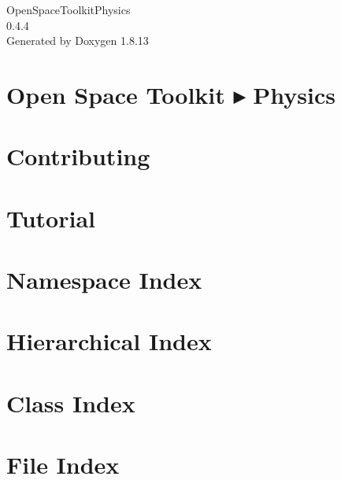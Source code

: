 \documentclass[twoside]{book}
\newcommand{\+}{\discretionary{\mbox{\scriptsize$\hookleftarrow$}}{}{}}
\newcommand{\clearemptydoublepage}{%
  \newpage{\pagestyle{empty}\cleardoublepage}%
}
\begin{document}
\hypersetup{pageanchor=false,
             bookmarksnumbered=true,
             pdfencoding=unicode
            }
\begin{titlepage}
\vspace*{7cm}
\begin{center}%
{\Large Open\+Space\+Toolkit\+Physics \\[1ex]\large 0.\+4.\+4 }\\
\vspace*{1cm}
{\large Generated by Doxygen 1.8.13}\\
\end{center}
\end{titlepage}
\clearemptydoublepage
{}
\tableofcontents
\clearemptydoublepage
{}
\hypersetup{pageanchor=true}

\chapter{Open Space Toolkit ▸ Physics}
\label{index}\hypertarget{index}{}
\chapter{Contributing}
\label{md__c_o_n_t_r_i_b_u_t_i_n_g}

\chapter{Tutorial}
\label{md_docs__tutorial}

\chapter{Namespace Index}

\chapter{Hierarchical Index}

\chapter{Class Index}

\chapter{File Index}

\end{document}
